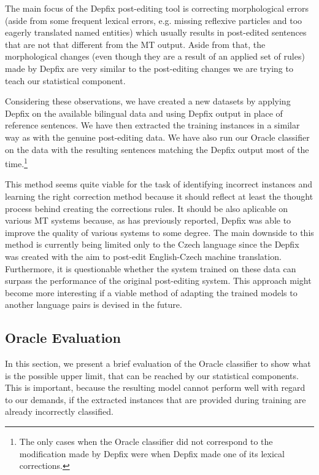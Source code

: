 The main focus of the Depfix post-editing tool is correcting morphological errors (aside from some
frequent lexical errors, e.g. missing reflexive particles and too eagerly translated named entities) which usually 
results in post-edited sentences that are not that different from the MT output. Aside from that,
the morphological changes (even though they are a result of an applied set of rules) made
by Depfix are very similar to the post-editing changes we are trying to teach our statistical component.

Considering these observations, we have created a new datasets by applying Depfix on the available bilingual data and
using Depfix output in place of reference sentences. We have then extracted the training instances in a
similar way as with the genuine post-editing data. We have also run our Oracle classifier on the data with
the resulting sentences matching the Depfix output most of the time.\footnote{The only cases when the Oracle classifier
did not correspond to the modification made by Depfix were when Depfix made one of its lexical corrections.}

This method seems quite viable for the task of identifying incorrect instances and learning the
right correction method because it should reflect at least the thought process behind creating the corrections rules.
It should be also aplicable on various MT systems because, as \citet{depfix:2014} has
previously reported, Depfix was able to improve the quality of various systems to some degree.
The main downside to this method is currently being
limited only to the Czech language since the Depfix was
created with the aim to post-edit English-Czech machine translation.
Furthermore, it is questionable whether the system trained on these data can surpass the performance
of the original post-editing system. 
This approach might become more interesting if a viable method of adapting the trained models
to another language pairs is devised in the future.

\subsection{Oracle Evaluation}

In this section, we present a brief evaluation of the Oracle classifier to show
what is the possible upper limit, that can be reached by our statistical components. This is
important, because the resulting model cannot perform well with regard to our demands, if the extracted
instances that are provided during training are already incorrectly classified.

